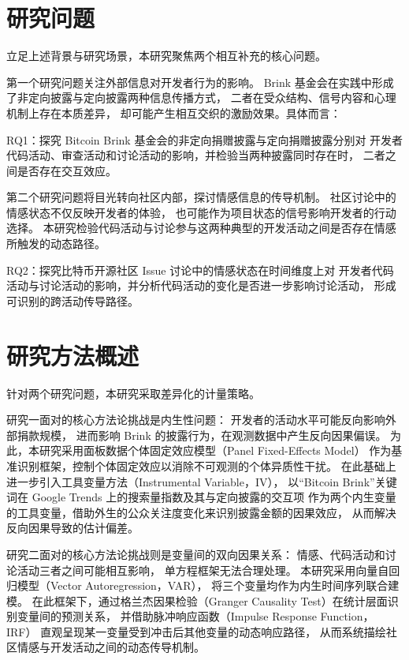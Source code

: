 \section{研究问题}

立足上述背景与研究场景，本研究聚焦两个相互补充的核心问题。

第一个研究问题关注外部信息对开发者行为的影响。
Brink 基金会在实践中形成了非定向披露与定向披露两种信息传播方式，
二者在受众结构、信号内容和心理机制上存在本质差异，
却可能产生相互交织的激励效果。具体而言：

RQ1：探究 Bitcoin Brink 基金会的非定向捐赠披露与定向捐赠披露分别对
开发者代码活动、审查活动和讨论活动的影响，并检验当两种披露同时存在时，
二者之间是否存在交互效应。

第二个研究问题将目光转向社区内部，探讨情感信息的传导机制。
社区讨论中的情感状态不仅反映开发者的体验，
也可能作为项目状态的信号影响开发者的行动选择。
本研究检验代码活动与讨论参与这两种典型的开发活动之间是否存在情感所触发的动态路径。

RQ2：探究比特币开源社区 Issue 讨论中的情感状态在时间维度上对
开发者代码活动与讨论活动的影响，并分析代码活动的变化是否进一步影响讨论活动，
形成可识别的跨活动传导路径。

\section{研究方法概述}

针对两个研究问题，本研究采取差异化的计量策略。

研究一面对的核心方法论挑战是内生性问题：
开发者的活动水平可能反向影响外部捐款规模，
进而影响 Brink 的披露行为，在观测数据中产生反向因果偏误。
为此，本研究采用面板数据个体固定效应模型（Panel Fixed-Effects Model）
作为基准识别框架，控制个体固定效应以消除不可观测的个体异质性干扰。
在此基础上进一步引入工具变量方法（Instrumental Variable，IV），
以“Bitcoin Brink”关键词在 Google Trends 上的搜索量指数及其与定向披露的交互项
作为两个内生变量的工具变量，借助外生的公众关注度变化来识别披露金额的因果效应，
从而解决反向因果导致的估计偏差。

研究二面对的核心方法论挑战则是变量间的双向因果关系：
情感、代码活动和讨论活动三者之间可能相互影响，
单方程框架无法合理处理。
本研究采用向量自回归模型（Vector Autoregression，VAR），
将三个变量均作为内生时间序列联合建模。
在此框架下，通过格兰杰因果检验（Granger Causality Test）在统计层面识别变量间的预测关系，
并借助脉冲响应函数（Impulse Response Function，IRF）
直观呈现某一变量受到冲击后其他变量的动态响应路径，
从而系统描绘社区情感与开发活动之间的动态传导机制。

